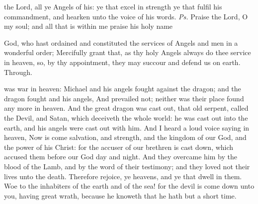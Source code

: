 \introit
{} the Lord, all ye Angels of his: ye that excel in strength ye that fulfil his commandment, and hearken unto the voice of his words. \textit{Ps.} Praise the Lord, O my soul; and all that is within me praise his holy name

\collect
{} God, who hast ordained and constituted the services of Angels and men in a wonderful order; Mercifully grant that, as thy holy Angels always do thee service in heaven, so, by thy appointment, they may succour and defend us on earth. Through.

 was war in heaven: Michael and his angels fought against the dragon; and the dragon fought and his angels, And prevailed not; neither was their place found any more in heaven. And the great dragon was cast out, that old serpent, called the Devil, and Satan, which deceiveth the whole world: he was cast out into the earth, and his angels were cast out with him. And I heard a loud voice saying in heaven, Now is come salvation, and strength, and the kingdom of our God, and the power of his Christ: for the accuser of our brethren is cast down, which accused them before our God day and night. And they overcame him by the blood of the Lamb, and by the word of their testimony; and they loved not their lives unto the death. Therefore rejoice, ye heavens, and ye that dwell in them. Woe to the inhabiters of the earth and of the sea! for the devil is come down unto you, having great wrath, because he knoweth that he hath but a short time.


